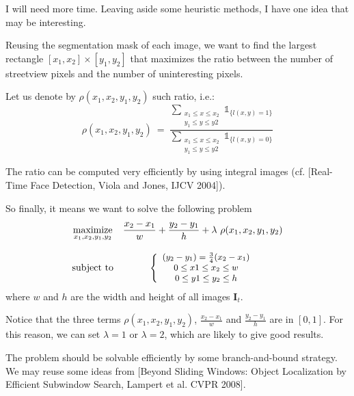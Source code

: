 \documentclass[a4paper,twoside,10pt]{article}
\begin{document}
I will need more time. Leaving aside some heuristic methods, I have one idea that may be interesting.

Reusing the segmentation mask of each image, we want to find the largest rectangle $[x_1, x_2] \times [y_1, y_2]$ that maximizes the ratio between the number of streetview pixels and the number of uninteresting pixels.

Let us denote by $\rho(x_1, x_2, y_1, y_2)$ such ratio, i.e.:
\begin{equation}
\rho(x_1, x_2, y_1, y_2) \ = \  
\frac{
  \displaystyle
  \sum_{\substack{x_1 \leq x \leq x_2\\y_1 \leq y \leq y2}} \mathds{1}_{\{l(x,y)=1\}}
}
{
  \displaystyle
  \sum_{\substack{x_1 \leq x \leq x_2\\y_1 \leq y \leq y2}} \mathds{1}_{\{l(x,y)=0\}}
}
\end{equation}

The ratio can be computed very efficiently by using integral images (cf. [Real-Time Face Detection, Viola and Jones, IJCV 2004]).

So finally, it means we want to solve the following problem
\begin{equation}
\begin{array}{cc}
\underset{x_1, x_2, y_1, y_2}{\text{maximize}} & \displaystyle \frac{x_2-x_1}{w} + \displaystyle \frac{y_2-y_1}{h} + \lambda\ \rho(x_1, x_2, y_1, y_2) \\
\\
\text{subject to} & 
  \left\{
  \small
  \begin{array}{c}
    (y_2-y_1) = \frac{3}{4} (x_2 - x_1) \\
    0 \leq x1 \leq x_2 \leq w \\
    0 \leq y1 \leq y_2 \leq h \\
  \end{array}
  \right.
\end{array}
\end{equation}
where $w$ and $h$ are the width and height of all images $\mathbf{I}_t$.

Notice that the three terms $\rho(x_1, x_2, y_1, y_2)$, $\displaystyle\frac{x_2-x_1}{w}$ and $\displaystyle\frac{y_2-y_1}{h}$ are in $[0, 1]$. For this reason, we can set $\lambda = 1$ or $\lambda=2$, which are likely to give good results.

The problem should be solvable efficiently by some branch-and-bound strategy. We may reuse some ideas from [Beyond Sliding Windows: Object Localization by Efficient Subwindow Search, Lampert et al. CVPR 2008].
\end{document}
